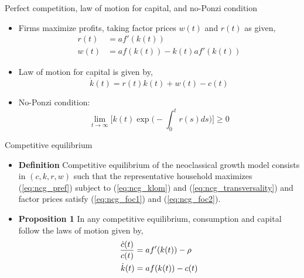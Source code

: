 \documentclass[10pt,notes=hide]{beamer}
\begin{document}
\begin{frame}{Perfect competition, law of motion for capital, and no-Ponzi condition}
\begin{itemize}
\item Firms maximize profits, taking factor prices $w(t)$ and $r(t)$ as given,
\begin{align}
r(t) &= a f'(k(t)) \label{eq:ncg_foc1} \\ 
w(t) &= a f(k(t)) - k(t) a f'(k(t))  \label{eq:ncg_foc2}
 \end{align}
\item Law of motion for capital is given by, 
\begin{equation}
\dot k(t) = r(t) k(t) + w(t) - c(t) \label{eq:ncg_klom}
\end{equation}
\item No-Ponzi condition:
\begin{equation}
\lim_{t\rightarrow\infty} \bigg[ k(t) \exp\bigg( - \int_0^t r(s) ds \bigg) \bigg] \geq 0 \label{eq:ncg_transversality}
\end{equation}
\end{itemize}
\end{frame}
\begin{frame}{Competitive equilibrium}
\begin{itemize}
\item {\bf Definition } Competitive equilibrium of the neoclassical growth model consists in $(c,k,r,w)$ such that the representative household maximizes (\ref{eq:ncg_pref}) subject to (\ref{eq:ncg_klom}) and (\ref{eq:ncg_transversality}) and factor prices satisfy (\ref{eq:ncg_foc1}) and (\ref{eq:ncg_foc2}).
\item {\bf Proposition 1} In any competitive equilibrium, consumption and capital follow the laws of motion given by,
\begin{align*}
{ \dot c(t) \over c(t) } &= a f'(k(t)) - \rho \\ 
\dot k(t) &= a f(k(t)) - c(t)
\end{align*}
\end{itemize}
\end{frame}
\end{document}
